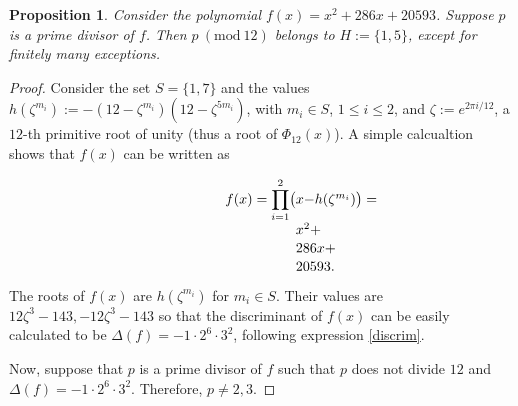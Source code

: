 \documentclass[a4paper, 12pt]{article}
\newtheorem{proposition}[theorem]{Proposition}
\theoremstyle{definition}
\theoremstyle{remark}
\newcommand{\Mod}[1]{\ (\mathrm{mod}\ #1)} %
\begin{document}
\begin{proposition}\label{th4murty}
Consider the polynomial $f(x)=x^{2} + 286 x + 20593$. Suppose $p$ is a prime divisor of $f$. Then $p \Mod{12}$ belongs to $H:=\{1,5\}$, except for finitely many exceptions.  
\end{proposition} 
\begin{proof}
Consider the set $S=\{1, 7\}$ and the values $h(\zeta^{m_i}):=-(12-\zeta^{m_i})(12-\zeta^{5m_i})$, with $m_i\in S$, $1 \leqslant i \leqslant 2$, and $\zeta:=e^{2\pi i/{12}}$, a $12$-th primitive root of unity (thus a root of $\Phi_{12}(x)$). A simple calcualtion shows that $f(x)$ can be written as

\begin{equation*}
\binoppenalty=10000 %
\mathchardef\plus=\mathcode`+ %
\mathcode`+="8000 %
\thinmuskip=0mu
\begingroup\lccode`~=`+
  \lowercase{\endgroup\def~}{%
    \plus\allowbreak\hspace{3pt plus 2pt}%
}
\hphantom{f(x)=\prod_{i=1}^{2}\big(}
\parbox{0.8\displaywidth}{\linespread{1.1}\selectfont
  \makebox[0pt][r]{$f(x)=\displaystyle\prod_{i=1}^{2}\big($}$x-h(\zeta^{m_i})\big)=x^{2} + 286 x + 20593.$
}
\end{equation*}


The roots of $f(x)$ are $h(\zeta^{m_i})$ for $m_i \in S$. Their values are $12 ζ^{3} - 143, -12 ζ^{3} - 143$ so that the discriminant of $f(x)$ can be easily calculated to be $\Delta(f)=-1 \cdot 2^{6} \cdot 3^{2}$, following expression \eqref{discrim}.

Now, suppose that $p$ is a prime divisor of $f$ such that $p$ does not divide $12$ and $\Delta(f)=-1 \cdot 2^{6} \cdot 3^{2}$. Therefore, $p\neq2, 3$.


\end{proof}
\end{document}
